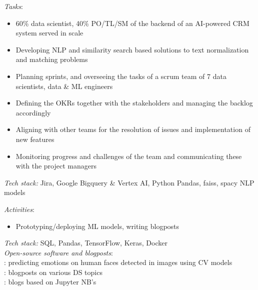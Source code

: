 \documentclass[
	a4paper,
]{fortysecondscv}
\begin{document}
\begin{cvtable}[1.0]
    
	{\href{https://datalogue.com}{\color{pblue}{Datalogue GmbH, Germany}}}
	{\textit{Tasks}: 
    \begin{itemize}[topsep=0pt,itemsep=0pt,partopsep=0pt, parsep=0pt, leftmargin=*]
     \setlength\itemsep{1mm}
     \item 60\% data scientist, 40\% PO/TL/SM of the backend of an AI-powered CRM system served in scale
     \item Developing NLP and similarity search based solutions to text normalization and matching problems
     \item Planning sprints, and overseeing the tasks of a scrum team of 7 data scientists, data \& ML engineers
     \item Defining the OKRs together with the stakeholders and managing the backlog accordingly
     \item Aligning with other teams for the resolution of issues and implementation of new features
     \item Monitoring progress and challenges of the team and communicating these with the project managers
    \end{itemize}
    \textit{Tech stack:} Jira, Google Bigquery \& Vertex AI, Python Pandas, faiss, spacy NLP models
    }
     
	{}
	{\textit{Activities}: 
    \begin{itemize}[topsep=0pt,itemsep=0pt,partopsep=0pt, parsep=0pt, leftmargin=*]
     \setlength\itemsep{1mm}
     \item Prototyping/deploying ML models, writing blogposts
    \end{itemize}
    \textit{Tech stack:} SQL, Pandas, TensorFlow, Keras, Docker\\
    \textit{Open-source software and blogposts}:\\
    \href{https://huggingface.co/spaces/OnurKerimoglu/facemoods}{\color{pblue}{FaceMoods}}: predicting emotions on human faces detected in images using CV models \\ %
    \href{https://medium.com/@kerimoglu.o}{\color{pblue}{Medium Profile}}: blogposts on various DS topics\\
    \href{https://onurkerimoglu.github.io/}{\color{pblue}{GitHub.io Pages}}: \href{https://quarto.org/}{\color{pblue}{quarto}} blogs based on Jupyter NB's
    }
    

\end{cvtable}
\end{document}

